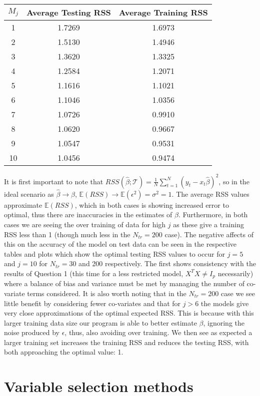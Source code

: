 \documentclass{article}
\begin{document}
\begin{center}
\begin{tabular}{ c | c c}
$M_j$ & Average Testing RSS & Average Training RSS \\
\hline
1 & 1.7269 & 1.6973 \\
2 & 1.5130 & 1.4946 \\
3 & 1.3620 & 1.3325 \\
4 & 1.2584 & 1.2071 \\
5 & 1.1616 & 1.1021 \\
6 & 1.1046 & 1.0356 \\
7 & 1.0726 & 0.9910 \\
8 & 1.0620 & 0.9667 \\
9 & 1.0547 & 0.9531 \\
10 & 1.0456 & 0.9474 \\
\end{tabular}
\end{center}

It is first important to note that $RSS(\hat{\beta};\mathcal{T})= \frac{1}{N} \sum_{t=1}^N(y_t-x_t \hat{\beta})^2$, so in the ideal scenario as $\hat{\beta} \to \beta$, $\mathbb{E}(RSS) \to \mathbb{E}(\epsilon^2)=\sigma^2=1$. The average RSS values approximate $\mathbb{E}(RSS)$, which in both cases is showing increased error to optimal, thus there are inaccuracies in the estimates of $\beta$. Furthermore, in both cases we are seeing the over training of data for high $j$ as these give a training RSS less than 1 (though much less in the $N_{tr}=200$ case). The negative affects of this on the accuracy of the model on test data can be seen in the respective tables and plots which show the optimal testing RSS values to occur for $j=5$ and $j=10$ for $N_{tr}=30$ and 200 respectively. The first shows consistency with the results of Question 1 (this time for a less restricted model, $X^T X \neq I_p$ necessarily) where a balance of bias and variance must be met by managing the number of co-variate terms considered. It is also worth noting that in the $N_{tr}=200$ case we see little benefit by considering fewer co-variates and that for $j>6$ the models give very close approximations of the optimal expected RSS. This is because with this larger training data size our program is able to better estimate $\beta$, ignoring the noise produced by $\epsilon$, thus, also avoiding over training. We then see as expected a larger training set increases the training RSS and reduces the testing RSS, with both approaching the optimal value: 1.

\section{Variable selection methods}
\end{document}
